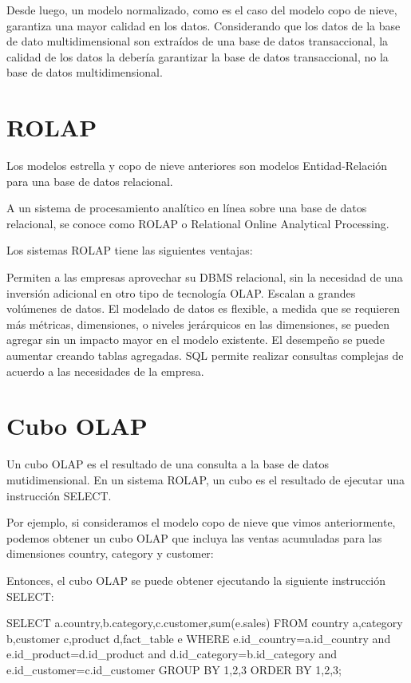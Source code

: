 Desde luego, un modelo normalizado, como es el caso del modelo copo de nieve, garantiza una mayor calidad en los datos. Considerando que los datos de la base de dato multidimensional son extraídos de una base de datos transaccional, la calidad de los datos la debería garantizar la base de datos transaccional, no la base de datos multidimensional.

\section{ROLAP}

Los modelos estrella y copo de nieve anteriores son modelos Entidad-Relación para una base de datos relacional.

A un sistema de procesamiento analítico en línea sobre una base de datos relacional, se conoce como ROLAP o Relational Online Analytical Processing.

Los sistemas ROLAP tiene las siguientes ventajas:

Permiten a las empresas aprovechar su DBMS relacional, sin la necesidad de una inversión adicional en otro tipo de tecnología OLAP. Escalan a grandes volúmenes de datos. El modelado de datos es flexible, a medida que se requieren más métricas, dimensiones, o niveles jerárquicos en las dimensiones, se pueden agregar sin un impacto mayor en el modelo existente. El desempeño se puede aumentar creando tablas agregadas. SQL permite realizar consultas complejas de acuerdo a las necesidades de la empresa.

\section{Cubo OLAP}

Un cubo OLAP es el resultado de una consulta a la base de datos mutidimensional. En un sistema ROLAP, un cubo es el resultado de ejecutar una instrucción SELECT.

Por ejemplo, si consideramos el modelo copo de nieve que vimos anteriormente, podemos obtener un cubo OLAP que incluya las ventas acumuladas para las dimensiones country, category y customer:

Entonces, el cubo OLAP se puede obtener ejecutando la siguiente instrucción SELECT:

\begin{SourceCode}
SELECT a.country,b.category,c.customer,sum(e.sales)
FROM country a,category b,customer c,product d,fact_table e
WHERE e.id_country=a.id_country and e.id_product=d.id_product
and d.id_category=b.id_category and e.id_customer=c.id_customer
GROUP BY 1,2,3
ORDER BY 1,2,3;
\end{SourceCode}

